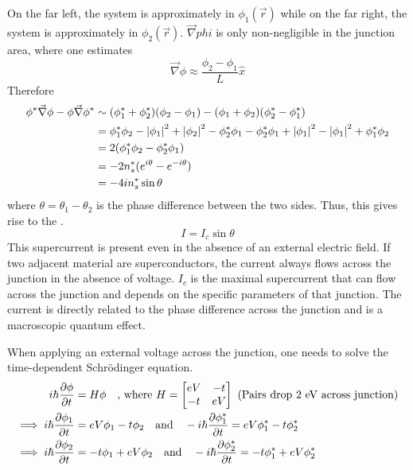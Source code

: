 \documentclass[12pt,a4paper,titlepage]{article}
\newcommand{\trm}[1]{\textrm{#1}} %
\newcommand{\ul}[1]{\underline{\smash{#1}}} %
\begin{document}
On the far left, the system is approximately in $\phi_{1}(\vec{r})$ while on the far right, the system is approximately in $\phi_{2}(\vec{r})$. $\vec{\nabla}phi$ is only non-negligible in the junction area, where one estimates
\begin{equation}
\vec{\nabla}\phi\approx\frac{\phi_{2}-\phi_{1}}{L}\hat{x}
\end{equation}
Therefore
\begin{equation}
\begin{aligned}
\phi^{*}\vec{\nabla}\phi-\phi\vec{\nabla}\phi^{*}&\sim(\phi_{1}^{*}+\phi_{2}^{*})(\phi_{2}-\phi_{1})-(\phi_{1}+\phi_{2})(\phi_{2}^{*}-\phi_{1}^{*})\\
&=\phi_{1}^{*}\phi_{2}-\abs{\phi_{1}}^{2}+\abs{\phi_{2}}^{2}-\phi_{2}^{*}\phi_{1}-\phi_{2}^{*}\phi_{1}+\abs{\phi_{1}}^{2}-\abs{\phi_{1}}^{2}+\phi_{1}^{*}\phi_{2}\\
&=2(\phi_{1}^{*}\phi_{2}-\phi_{2}^{*}\phi_{1})\\
&=-2n_{s}^{*}(e^{i\theta}-e^{-i\theta})\\
&=-4in_{s}^{*}\sin\theta
\end{aligned}
\end{equation}
where $\theta=\theta_{1}-\theta_{2}$ is the phase difference between the two sides. Thus, this gives rise to the \ul{DC Josephson effect}.
\begin{equation}
I=I_{c}\sin\theta
\end{equation}
This supercurrent is present even in the absence of an external electric field. If two adjacent material are superconductors, the current always flows across the junction in the absence of voltage. $I_{c}$ is the maximal supercurrent that can flow across the junction and depends on the specific parameters of that junction. The current is directly related to the phase difference across the junction and is a macroscopic quantum effect.
\begin{center}
\end{center}
When applying an external voltage across the junction, one needs to solve the time-dependent Schr\"{o}dinger equation.
\begin{equation}
\begin{aligned}
i\hbar\pdv{\phi}{t}&=H\phi\quad\trm{, where }H=\begin{bmatrix}
eV & -t\\
-t & eV
\end{bmatrix}\trm{ (Pairs drop 2 eV across junction)}\\
\implies i\hbar\pdv{\phi_{1}}{t}&=eV\phi_{1}-t\phi_{2}\quad\trm{and}\quad -i\hbar\pdv{\phi_{1}^{*}}{t}=eV\phi_{1}^{*}-t\phi_{2}^{*}\\
\implies i\hbar\pdv{\phi_{2}}{t}&=-t\phi_{1}+eV\phi_{2}\quad\trm{and}\quad -i\hbar\pdv{\phi_{2}^{*}}{t}=-t\phi_{1}^{*}+eV\phi_{2}^{*}
\end{aligned}
\end{equation}
\end{document}

